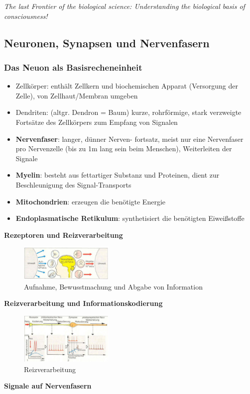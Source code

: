 \emph{The last Frontier of the biological science: Understanding the biological basis of consciousness!}
\subsection{Neuronen, Synapsen und Nervenfasern}
\subsubsection{Das Neuon als Basisrecheneinheit}
\begin{itemize}
\item Zellkörper: enthält Zellkern und biochemischen Apparat (Versorgung der Zelle), von Zellhaut/Membran umgeben
\item Dendriten: (altgr. Dendron = \glqq Baum\grqq) kurze, rohrförmige, stark verzweigte Fortsätze des Zellkörpers zum Empfang von Signalen
\item \textbf{Nervenfaser}: langer, dünner Nerven-
fortsatz, meist nur eine Nervenfaser pro
Nervenzelle (bis zu 1m lang sein beim
Menschen), Weiterleiten der Signale
\item \textbf{Myelin}: besteht aus fettartiger Substanz und Proteinen,
dient zur Beschleunigung des Signal-Transports
\item \textbf{Mitochondrien}: erzeugen die benötigte Energie
\item \textbf{Endoplasmatische Retikulum}: synthetisiert die benötigten Eiweißstoffe
\end{itemize}
\textbf{Rezeptoren und Reizverarbeitung}
\begin{figure}[h!]
	\centering
	\includegraphics[width=0.4\textwidth]{figures/ch07_sensinput.png}
	\caption{Aufnahme, Bewusstmachung und Abgabe von Information}
	\label{sensinput}
\end{figure}
\textbf{Reizverarbeitung und Informationskodierung}
\begin{figure}[h!]
	\centering
	\includegraphics[width=0.4\textwidth]{figures/ch07_reizverarbeitung.png}
	\caption{Reizverarbeitung}
	\label{reizverarbeitung}
\end{figure}
\textbf{Signale auf Nervenfasern}
